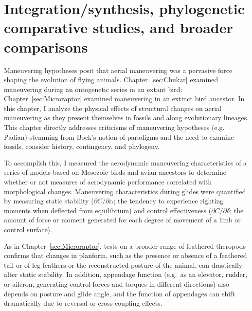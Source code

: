 \section{Integration/synthesis, phylogenetic comparative studies, and broader comparisons}
\label{sec:Comparative}
Maneuvering hypotheses posit that aerial maneuvering was a pervasive force shaping the evolution of flying animals. Chapter~\ref{sec:Chukar} examined maneuvering during an ontogenetic series in an extant bird; Chapter~\ref{sec:Microraptor} examined maneuvering in an extinct bird ancestor. In this chapter, I analyze the physical effects of structural changes on aerial maneuvering as they present themselves in fossils and along evolutionary lineages. This chapter directly addresses criticisms of maneuvering hypotheses (e.g. Padian) stemming from Bock's notion of paradigms and the need to examine fossils, consider history, contingency, and phylogeny.  

To accomplish this, I measured the aerodynamic maneuvering characteristics of a series of models based on Mesozoic birds and avian ancestors to determine whether or not measures of aerodynamic performance correlated with morphological changes. Maneuvering characteristics during glides were quantified by measuring static stability ($\partial C/\partial\alpha$; the tendency to experience righting moments when deflected from equilibrium) and control effectiveness ($\partial C/\partial\delta$; the amount of force or moment generated for each degree of movement of a limb or control surface). 

As in Chapter~\ref{sec:Microraptor}, tests on a broader range of feathered theropods confirms that changes in planform, such as the presence or absence of a feathered tail or of leg feathers or the reconstructed posture of the animal, can drastically alter static stability. In addition, appendage function (e.g.\ as an elevator, rudder, or aileron, generating control forces and torques in different directions) also depends on posture and glide angle, and the function of appendages can shift dramatically due to reversal or cross-coupling effects. 

